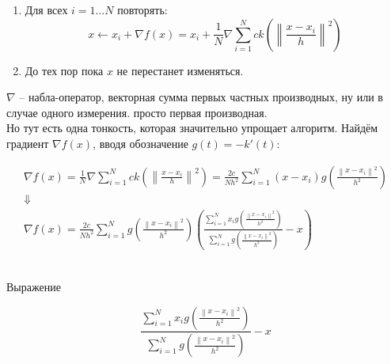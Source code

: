\documentclass[11pt]{article}
\begin{document}
\begin{enumerate}
\item Для всех $i=1 \ldots N$ повторять:
$$
x \gets x_i + \nabla f(x) = x_i + \frac{1}{N}\nabla\sum\limits_{i = 1}^{N}ck\left(\left\|\frac{x - x_i}{h}\right\|^2\right)
$$
\item До тех пор пока $x$ не перестанет изменяться.
\end{enumerate}

$\nabla$ -- набла-оператор, векторная сумма первых частных
производных, ну или в случае одного измерения. просто первая
производная. \\ Но тут есть одна тонкость, которая
значительно упрощает алгоритм. Найдём градиент $\nabla f(x)$, вводя
обозначение $g(t) = -k'(t)$:

\begin{gather*}
\nabla f(x) = \frac{1}{N}\nabla\sum\limits_{i = 1}^{N}ck\left(\left\|\frac{x - x_i}{h}\right\|^2\right) = \frac{2c}{Nh^2}\sum\limits_{i = 1}^{N}\left(x - x_i \right)g\left(\frac{\left\|x - x_i\right\|^2}{h^2}\right) \\
\Downarrow \\
\nabla f(x) = \frac{2c}{Nh^2}\sum\limits_{i = 1}^{N}g\left(\frac{\left\|x - x_i\right\|^2}{h^2}\right)\left(\frac{\sum\limits_{i = 1}^{N}x_i g\left(\frac{\left\|x - x_i\right\|^2}{h^2}\right)}{\sum\limits_{i = 1}^{N}g\left(\frac{\left\|x - x_i\right\|^2}{h^2}\right)} - x \right)
\end{gather*}

\\ Выражение

$$
\boxed{\frac{\sum\limits_{i = 1}^{N}x_i g\left(\frac{\left\|x - x_i\right\|^2}{h^2}\right)}{\sum\limits_{i = 1}^{N}g\left(\frac{\left\|x - x_i\right\|^2}{h^2}\right)} - x}
$$
\end{document}
